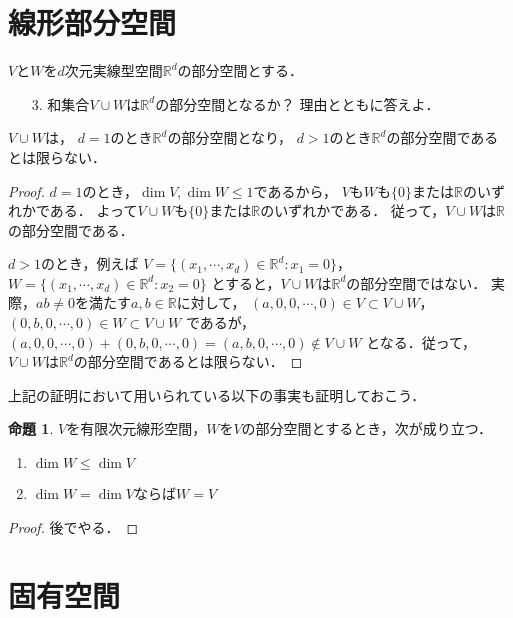 \documentclass{jsarticle}
\theoremstyle{definition}
\newtheorem{prop}[defi]{命題}
\begin{document}
\section{線形部分空間}

\begin{screen}
$V$と$W$を$d$次元実線型空間$\mathbb{R}^d$の部分空間とする．
\begin{itemize}
\item[3.]和集合$V\cup W$は$\mathbb{R}^d$の部分空間となるか？
理由とともに答えよ．
\end{itemize}
\end{screen}

$V\cup W$は，
$d=1$のとき$\mathbb{R}^d$の部分空間となり，
$d>1$のとき$\mathbb{R}^d$の部分空間であるとは限らない．

\begin{proof}
$d=1$のとき，$\dim{V},\dim{W}\leq1$であるから，
$V$も$W$も$\{0\}$または$\mathbb{R}$のいずれかである．
よって$V\cup W$も$\{0\}$または$\mathbb{R}$のいずれかである．
従って，$V\cup W$は$\mathbb{R}$の部分空間である．

$d>1$のとき，例えば
$V=\{(x_1,\cdots,x_d)\in\mathbb{R}^d:x_1=0\}$，
$W=\{(x_1,\cdots,x_d)\in\mathbb{R}^d:x_2=0\}$
とすると，$V\cup W$は$\mathbb{R}^d$の部分空間ではない．
実際，$ab\neq0$を満たす$a,b\in\mathbb{R}$に対して，
$(a,0,0,\cdots,0)\in V\subset V\cup W$，$(0,b,0,\cdots,0)\in W\subset V\cup W$
であるが，
$(a,0,0,\cdots,0)+(0,b,0,\cdots,0)=(a,b,0,\cdots,0)\notin V\cup W$
となる．従って，$V\cup W$は$\mathbb{R}^d$の部分空間であるとは限らない．
\end{proof}

上記の証明において用いられている以下の事実も証明しておこう．

\begin{prop}
$V$を有限次元線形空間，$W$を$V$の部分空間とするとき，次が成り立つ．
\begin{enumerate}
\item $\dim{W}\leq\dim{V}$
\item $\dim{W}=\dim{V}$ならば$W=V$
\end{enumerate}
\end{prop}

\begin{proof}
後でやる．
\end{proof}

\section{固有空間}
\end{document}
